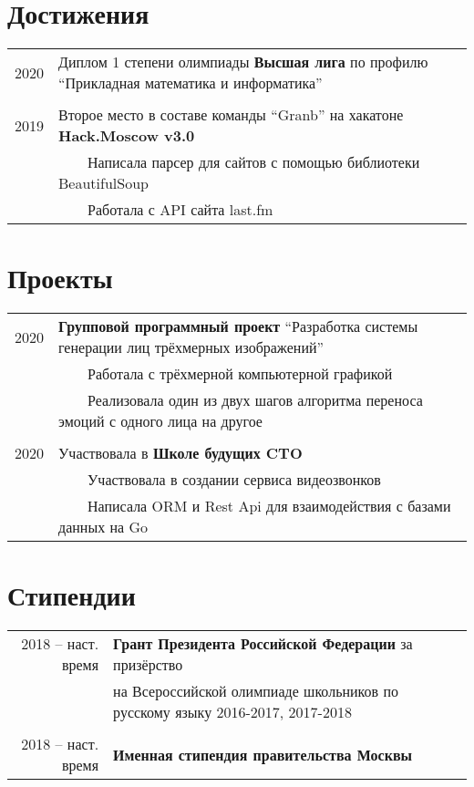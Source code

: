 \documentclass[a4paper,10pt]{article}
\newcommand{\tabitem}{~~\llap{\textbullet}~~}
\begin{document}
\section{Достижения}
\begin{tabular}{rl}
\hspace{0.9cm} 2020 & Диплом 1 степени олимпиады \textbf{Высшая лига} по профилю ``Прикладная математика и информатика'' \\
&\\
\hspace{0.9cm} 2019 & Второе место в составе команды ``Granb'' на хакатоне \textbf{Hack.Moscow v3.0} \\
& \tabitem Написала парсер для сайтов с помощью библиотеки BeautifulSoup \\
& \tabitem Работала с API сайта last.fm \\
\end{tabular}

\section{Проекты}
\begin{tabular}{rl}
\hspace{0.9cm} 2020 & \textbf{Групповой программный проект} ``Разработка системы генерации лиц трёхмерных изображений'' \\
& \tabitem Работала с трёхмерной компьютерной графикой \\
& \tabitem Реализовала один из двух шагов алгоритма переноса эмоций с одного лица на другое\\
&\\
\hspace{0.9cm} 2020 & Участвовала в \textbf{Школе будущих CTO} \\
& \tabitem Участвовала в создании сервиса видеозвонков \\
& \tabitem Написала ORM и Rest Api для взаимодействия с базами данных на Go \\
\end{tabular}

\section{Стипендии}
\begin{tabular}{rl}
2018 -- наст. время & \textbf{Грант Президента Российской Федерации} за призёрство \\
& на Всероссийской олимпиаде школьников по русскому языку 2016-2017, 2017-2018 \\
&\\
2018 -- наст. время & \textbf{Именная стипендия правительства Москвы} \\
\end{tabular}
\end{document}
